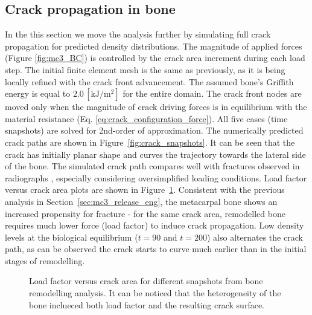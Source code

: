 \documentclass[review]{elsarticle}
\numberwithin{equation}{section}
\begin{document}
\subsection{Crack propagation in bone}
In the this section we move the analysis further by simulating full crack propagation for predicted density distributions. The magnitude of applied forces (Figure \ref{fig:mc3_BC}) is controlled by the crack area increment during each load step. The initial finite element mesh is the same as previously, as it is being locally refined with the crack front advancement. The assumed bone's Griffith energy is equal to $2.0\,[\mathrm{ kJ/m^2}]$ for the entire domain. The crack front nodes are moved only when the magnitude of crack driving forces is in equilibrium with the material resistance (Eq. \ref{eq:crack_configuration_force}). 
All five cases (time snapshots) are solved for 2nd-order of approximation.
The numerically predicted crack paths are shown in Figure~\ref{fig:crack_snapshots}. 
It can be seen that the crack has initially planar shape and curves the trajectory towards the lateral side of the bone. The simulated crack path compares well with fractures observed in radiographs \citep{whitton2010third}, especially considering oversimplified loading conditions. Load factor versus crack area plots are shown in Figure~\ref{fig:crack_remodel_frac_compar}. Consistent with the previous analysis in Section~\ref{sec:mc3_release_eng}, the metacarpal bone shows an increased propensity for fracture - for the same crack area, remodelled bone requires much lower force (load factor) to induce crack propagation. Low density levels at the biological equilibrium ($t=90$ and $t=200$) also alternates the crack path, as can be observed the crack starts to curve much earlier than in the initial stages of remodelling. 

\begin{figure}[h!]
	\centering
	\caption{Load factor versus crack area for different snapshots from bone remodelling analysis. It can be noticed that the heterogeneity of the bone inclueced both load factor and the resulting crack surface.}
	\label{fig:crack_remodel_frac_compar}
\end{figure}
\end{document}
